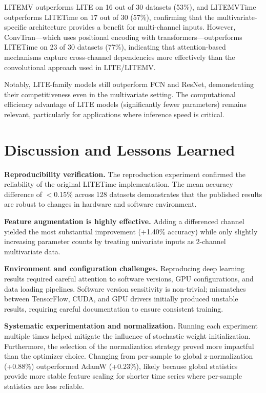 \documentclass[conference]{IEEEtran}
\begin{document}
LITEMV outperforms LITE on 16 out of 30 datasets (53\%), and LITEMVTime outperforms LITETime on 17 out of 30 (57\%), confirming that the multivariate-specific architecture provides a benefit for multi-channel inputs. However, ConvTran---which uses positional encoding with transformers---outperforms LITETime on 23 of 30 datasets (77\%), indicating that attention-based mechanisms capture cross-channel dependencies more effectively than the convolutional approach used in LITE/LITEMV.

Notably, LITE-family models still outperform FCN and ResNet, demonstrating their competitiveness even in the multivariate setting. The computational efficiency advantage of LITE models (significantly fewer parameters) remains relevant, particularly for applications where inference speed is critical.

\section{Discussion and Lessons Learned}

\textbf{Reproducibility verification.} The reproduction experiment confirmed the reliability of the original LITETime implementation. The mean accuracy difference of $<$0.15\% across 128 datasets demonstrates that the published results are robust to changes in hardware and software environment.

\textbf{Feature augmentation is highly effective.} Adding a differenced channel yielded the most substantial improvement (+1.40\% accuracy) while only slightly increasing parameter counts by treating univariate inputs as 2-channel multivariate data.

\textbf{Environment and configuration challenges.} Reproducing deep learning results required careful attention to software versions, GPU configurations, and data loading pipelines. Software version sensitivity is non-trivial; mismatches between TensorFlow, CUDA, and GPU drivers initially produced unstable results, requiring careful documentation to ensure consistent training.

\textbf{Systematic experimentation and normalization.} Running each experiment multiple times helped mitigate the influence of stochastic weight initialization. Furthermore, the selection of the normalization strategy proved more impactful than the optimizer choice. Changing from per-sample to global z-normalization (+0.88\%) outperformed AdamW (+0.23\%), likely because global statistics provide more stable feature scaling for shorter time series where per-sample statistics are less reliable.
\end{document}
